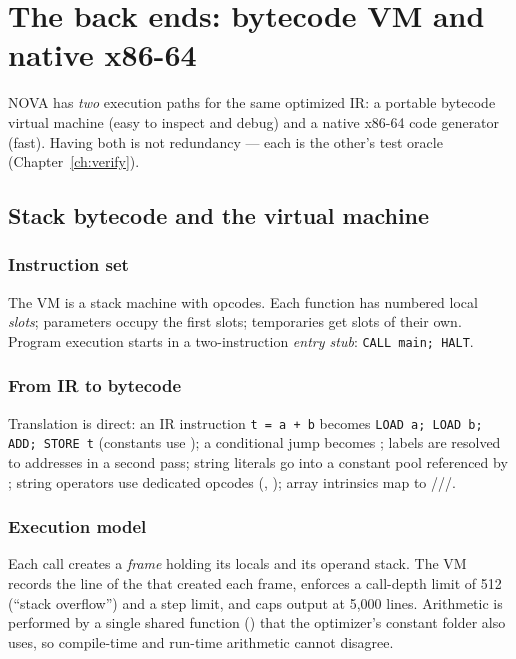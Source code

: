 \chapter{The back ends: bytecode VM and native x86-64}
\label{ch:backends}

NOVA has \emph{two} execution paths for the same optimized IR: a portable bytecode virtual machine (easy to inspect and debug) and a native x86-64 code generator (fast). Having both is not redundancy --- each is the other's test oracle (Chapter~\ref{ch:verify}).

\section{Stack bytecode and the virtual machine}
\subsection{Instruction set}
The VM is a stack machine with \NumOpcodes{} opcodes. Each function has numbered local \emph{slots}; parameters occupy the first slots; temporaries get slots of their own. Program execution starts in a two-instruction \emph{entry stub}: \verb|CALL main; HALT|.

\begingroup\small

\endgroup
{}

\subsection{From IR to bytecode}
Translation is direct: an IR instruction \verb|t = a + b| becomes \verb|LOAD a; LOAD b; ADD; STORE t| (constants use ); a conditional jump becomes ; labels are resolved to addresses in a second pass; string literals go into a constant pool referenced by ; string operators use dedicated opcodes (, ); array intrinsics map to ///.

\subsection{Execution model}
Each call creates a \emph{frame} holding its locals and its operand stack. The VM records the line of the  that created each frame, enforces a call-depth limit of 512 (``stack overflow'') and a step limit, and caps output at 5{,}000 lines. Arithmetic is performed by a single shared function () that the optimizer's constant folder also uses, so compile-time and run-time arithmetic cannot disagree.

